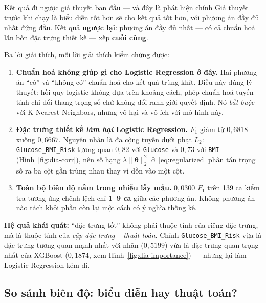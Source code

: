 \begin{phathien}{Kết quả đi ngược giả thuyết ban đầu --- và đây là phát hiện chính}
\label{sec:dactrung-tot}
Giả thuyết trước khi chạy là biểu diễn tốt hơn sẽ cho kết quả tốt hơn, với
phương án đầy đủ nhất đứng đầu. Kết quả \textbf{ngược lại}: phương án đầy đủ
nhất --- có cả chuẩn hoá lẫn bốn đặc trưng thiết kế --- xếp \textbf{cuối cùng}.

Ba lời giải thích, mỗi lời giải thích kiểm chứng được:

\begin{enumerate}
  \item \textbf{Chuẩn hoá không giúp gì cho Logistic Regression ở đây.} Hai
        phương án ``có'' và ``không có'' chuẩn hoá cho kết quả trùng khít. Điều
        này đúng lý thuyết: hồi quy logistic không dựa trên khoảng cách, phép
        chuẩn hoá tuyến tính chỉ đổi thang trọng số chứ không đổi ranh giới
        quyết định. Nó \emph{bắt buộc} với K-Nearest Neighbors, nhưng vô hại và
        vô ích với mô hình này.
  \item \textbf{Đặc trưng thiết kế \emph{làm hại} Logistic Regression.} $F_1$
        giảm từ $0{,}6818$ xuống $0{,}6667$. Nguyên nhân là đa cộng tuyến dưới
        phạt $L_2$: \texttt{Glucose\_BMI\_Risk} tương quan $0{,}82$ với
        \texttt{Glucose} và $0{,}73$ với \texttt{BMI}
        (Hình~\ref{fig:dia-corr}), nên số hạng
        $\lambda\lVert\bm\theta\rVert_2^2$ ở~\eqref{eq:regularized} phân tán
        trọng số ra ba cột gần trùng nhau thay vì dồn vào một cột.
  \item \textbf{Toàn bộ biên độ nằm trong nhiễu lấy mẫu.} $0{,}0300$ $F_1$ trên
        139 ca kiểm tra tương ứng chênh lệch chỉ \textbf{1--9 ca} giữa các
        phương án. Không phương án nào tách khỏi phần còn lại một cách có ý
        nghĩa thống kê.
\end{enumerate}

\textbf{Hệ quả khái quát:} ``đặc trưng tốt'' không phải thuộc tính của riêng đặc
trưng, mà là thuộc tính của \emph{cặp đặc trưng -- thuật toán}. Chính
\texttt{Glucose\_BMI\_Risk} vừa là đặc trưng tương quan mạnh nhất với nhãn
($0{,}5199$) vừa là đặc trưng quan trọng nhất của XGBoost ($0{,}1874$, xem
Hình~\ref{fig:dia-importance}) --- nhưng lại làm Logistic Regression kém đi.
\end{phathien}

\subsection{So sánh biên độ: biểu diễn hay thuật toán?}

